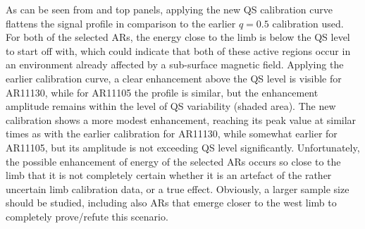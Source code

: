 \documentclass{aa}
\begin{document}
As can be seen
from  and  top panels, 
applying the new QS calibration curve flattens the signal profile in comparison to the
earlier $q=0.5$ calibration used. For both of the selected ARs, the \fff energy close to the limb is below the QS level to start off with, which could indicate that both of these active regions occur in an environment
already affected by a sub-surface magnetic field. 
Applying the earlier calibration curve, a clear enhancement above the QS level is visible for AR11130, while for AR11105 the profile is similar, but the enhancement amplitude remains within the level of QS variability (shaded area). The new calibration shows a more modest enhancement, reaching its peak value at similar times as with the earlier calibration for AR11130, while somewhat earlier for AR11105, but its amplitude is not exceeding QS level significantly. Unfortunately, the possible enhancement of \fff energy of the selected ARs occurs so close to the limb that it is not completely certain whether it is an artefact of the rather uncertain limb calibration data, or a true effect. Obviously, a larger sample size should be studied, including also ARs that emerge closer to the west limb to completely prove/refute this scenario.  


\end{document}
